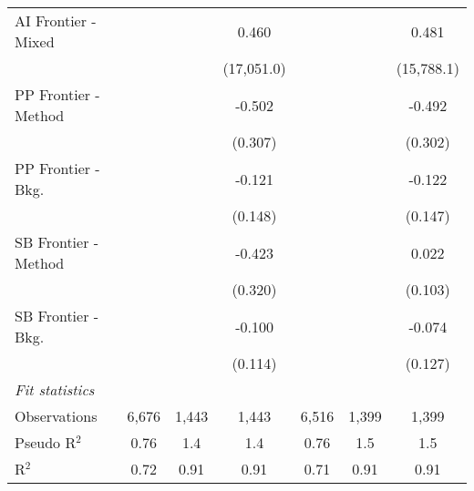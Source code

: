 \begin{tabular}{lcccccc}
   AI Frontier - Mixed  &               &         & 0.460        &              &         & 0.481\\   
                        &               &         & (17,051.0)   &              &         & (15,788.1)\\   
   PP Frontier - Method &               &         & -0.502       &              &         & -0.492\\   
                        &               &         & (0.307)      &              &         & (0.302)\\   
   PP Frontier - Bkg.   &               &         & -0.121       &              &         & -0.122\\   
                        &               &         & (0.148)      &              &         & (0.147)\\   
   SB Frontier - Method &               &         & -0.423       &              &         & 0.022\\   
                        &               &         & (0.320)      &              &         & (0.103)\\   
   SB Frontier - Bkg.   &               &         & -0.100       &              &         & -0.074\\   
                        &               &         & (0.114)      &              &         & (0.127)\\   
   \midrule
   \emph{Fit statistics}\\
   Observations         & 6,676         & 1,443   & 1,443        & 6,516        & 1,399   & 1,399\\  
   Pseudo R$^2$         & 0.76          & 1.4     & 1.4          & 0.76         & 1.5     & 1.5\\  
   R$^2$                & 0.72          & 0.91    & 0.91         & 0.71         & 0.91    & 0.91\\  
   

\end{tabular}
